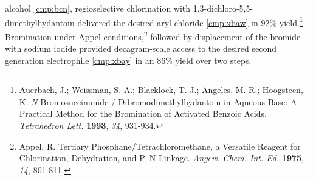 alcohol \ref{cmp:bcn}, regioselective chlorination with 1,3-dichloro-5,5-dimethylhydantoin delivered
the desired aryl-chloride \ref{cmp:xbaw} in 92\% yield.\footnote{{\frenchspacing Auerbach, J.;
Weissman, S. A.; Blacklock, T. J.; Angeles, M. R.; Hoogsteen, K.
\textit{N}-Bromosuccinimide / Dibromodimethylhydantoin in Aqueous Base: A Practical Method for the
Bromination of Activated Benzoic Acids. \textit{Tetrahedron Lett.} \textbf{1993}, \textit{34},
931-934.}} Bromination under Appel conditions,\footnote{{\frenchspacing Appel, R. Tertiary
Phosphane/Tetrachloromethane, a Versatile Reagent for Chlorination, Dehydration, and P--N Linkage.
\textit{Angew. Chem. Int. Ed.} \textbf{1975}, \textit{14}, 801-811.}} followed by displacement of
the bromide with sodium iodide provided decagram-scale access to the desired second generation
electrophile \ref{cmp:xbay} in an 86\% yield over two steps.

